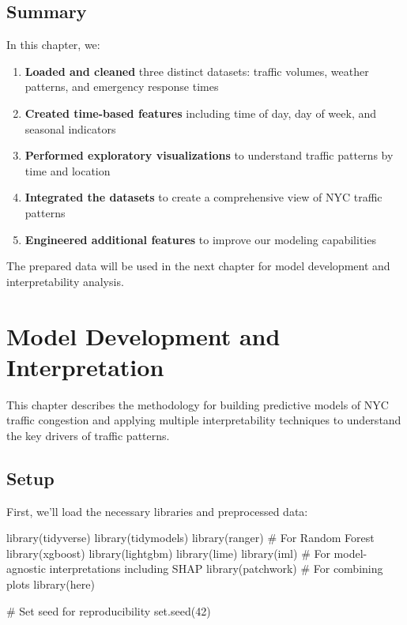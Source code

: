 \documentclass[
  letterpaper,
  DIV=11,
  numbers=noendperiod]{scrreprt}
\newenvironment{Shaded}{\begin{snugshade}}{\end{snugshade}}
\newcommand{\CommentTok}[1]{\textcolor[rgb]{0.37,0.37,0.37}{#1}}
\newcommand{\DecValTok}[1]{\textcolor[rgb]{0.68,0.00,0.00}{#1}}
\newcommand{\FunctionTok}[1]{\textcolor[rgb]{0.28,0.35,0.67}{#1}}
\newcommand{\NormalTok}[1]{\textcolor[rgb]{0.00,0.23,0.31}{#1}}
\providecommand{\tightlist}{%
  \setlength{\itemsep}{0pt}\setlength{\parskip}{0pt}}\usepackage{longtable,booktabs,array}
\begin{document}
\section{Summary}\label{summary}

In this chapter, we:

\begin{enumerate}
\def\labelenumi{\arabic{enumi}.}
\tightlist
\item
  \textbf{Loaded and cleaned} three distinct datasets: traffic volumes,
  weather patterns, and emergency response times
\item
  \textbf{Created time-based features} including time of day, day of
  week, and seasonal indicators
\item
  \textbf{Performed exploratory visualizations} to understand traffic
  patterns by time and location
\item
  \textbf{Integrated the datasets} to create a comprehensive view of NYC
  traffic patterns
\item
  \textbf{Engineered additional features} to improve our modeling
  capabilities
\end{enumerate}

The prepared data will be used in the next chapter for model development
and interpretability analysis.


\chapter{Model Development and
Interpretation}\label{model-development-and-interpretation}

This chapter describes the methodology for building predictive models of
NYC traffic congestion and applying multiple interpretability techniques
to understand the key drivers of traffic patterns.

\section{Setup}\label{setup}

First, we'll load the necessary libraries and preprocessed data:

\begin{Shaded}
\begin{Highlighting}[]
\FunctionTok{library}\NormalTok{(tidyverse)}
\FunctionTok{library}\NormalTok{(tidymodels)}
\FunctionTok{library}\NormalTok{(ranger) }\CommentTok{\# For Random Forest}
\FunctionTok{library}\NormalTok{(xgboost)}
\FunctionTok{library}\NormalTok{(lightgbm)}
\FunctionTok{library}\NormalTok{(lime)}
\FunctionTok{library}\NormalTok{(iml) }\CommentTok{\# For model{-}agnostic interpretations including SHAP}
\FunctionTok{library}\NormalTok{(patchwork) }\CommentTok{\# For combining plots}
\FunctionTok{library}\NormalTok{(here)}

\CommentTok{\# Set seed for reproducibility}
\FunctionTok{set.seed}\NormalTok{(}\DecValTok{42}\NormalTok{)}
\end{Highlighting}
\end{Shaded}
\end{document}
